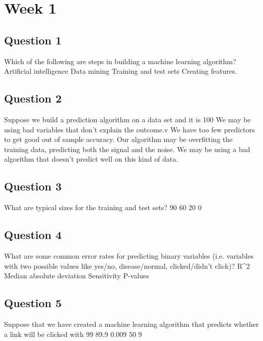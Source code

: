 \documentclass[DSS8main.tex]{subfiles}
\begin{document}
\section{Week 1}
\subsection{Question 1}
Which of the following are steps in building a machine learning algorithm?
Artificial intelligence
Data mining
Training and test sets
Creating features.
\subsection{Question 2}
Suppose we build a prediction algorithm on a data set and it is 100%
We may be using bad variables that don't explain the outcome.v
We have too few predictors to get good out of sample accuracy.
Our algorithm may be overfitting the training data, predicting both the signal and the noise.
We may be using a bad algorithm that doesn't predict well on this kind of data.
\subsection{Question 3}
What are typical sizes for the training and test sets?
90%
60%
20%
0%
\subsection{Question 4}
What are some common error rates for predicting binary variables (i.e. variables with two possible values like yes/no, disease/normal, clicked/didn't click)?
R^2
Median absolute deviation
Sensitivity
P-values
\subsection{Question 5}
Suppose that we have created a machine learning algorithm that predicts whether a link will be clicked with 99%
89.9%
0.009%
50%
9%
\end{document}
